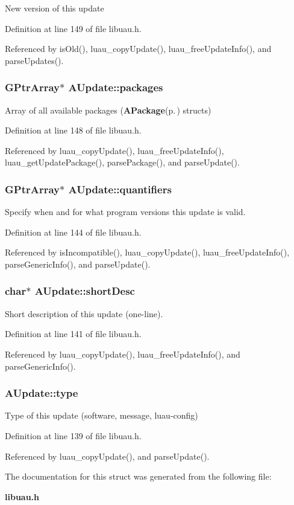 New version of this update 

Definition at line 149 of file libuau.h.

Referenced by is\-Old(), luau\_\-copy\-Update(), luau\_\-free\-Update\-Info(), and parse\-Updates().
\subsubsection{\setlength{\rightskip}{0pt plus 5cm}GPtr\-Array$\ast$ {\bf AUpdate::packages}}\label{structAUpdate_o8}


Array of all available packages ({\bf APackage}{\rm (p.\,\pageref{structAPackage})} structs) 

Definition at line 148 of file libuau.h.

Referenced by luau\_\-copy\-Update(), luau\_\-free\-Update\-Info(), luau\_\-get\-Update\-Package(), parse\-Package(), and parse\-Update().
\subsubsection{\setlength{\rightskip}{0pt plus 5cm}GPtr\-Array$\ast$ {\bf AUpdate::quantifiers}}\label{structAUpdate_o6}


Specify when and for what program versions this update is valid. 

Definition at line 144 of file libuau.h.

Referenced by is\-Incompatible(), luau\_\-copy\-Update(), luau\_\-free\-Update\-Info(), parse\-Generic\-Info(), and parse\-Update().
\subsubsection{\setlength{\rightskip}{0pt plus 5cm}char$\ast$ {\bf AUpdate::short\-Desc}}\label{structAUpdate_o4}


Short description of this update (one-line). 

Definition at line 141 of file libuau.h.

Referenced by luau\_\-copy\-Update(), luau\_\-free\-Update\-Info(), and parse\-Generic\-Info().
\subsubsection{ {\bf AUpdate::type}}\label{structAUpdate_o2}


Type of this update (software, message, luau-config) 

Definition at line 139 of file libuau.h.

Referenced by luau\_\-copy\-Update(), and parse\-Update().

The documentation for this struct was generated from the following file:\begin{CompactItemize}
\item 
{\bf libuau.h}\end{CompactItemize}
